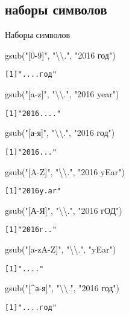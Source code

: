 \subsection{наборы символов}
\begin{frame}[fragile]{Наборы символов}
\begin{multicols}{2}
\begin{itemize} 
\mytem gsub("[0-9]"{}, "\textbackslash\textbackslash.{}"{}, "2016 год")
\footnotesize
\begin{alltt}
[1] ".... год"
\end{alltt}
\normalsize
\vfill
\mytem gsub("[a-z]"{}, "\textbackslash\textbackslash.{}"{}, "2016 year")
\footnotesize
\begin{alltt}
[1] "2016 ....{}"
\end{alltt}
\normalsize
\vfill
\mytem gsub("[а-я]"{}, "\textbackslash\textbackslash.{}"{}, "2016 год")
\footnotesize
\begin{alltt}
[1] "2016 ...{}"
\end{alltt}
\normalsize
\columnbreak
\mytem gsub("[A-Z]"{}, "\textbackslash\textbackslash.{}"{}, "2016 yEar")
\footnotesize
\begin{alltt}
[1] "2016 y.ar"
\end{alltt}
\normalsize
\vfill
\mytem gsub("[А-Я]"{}, "\textbackslash\textbackslash.{}"{}, "2016 гОД")
\footnotesize
\begin{alltt}
[1] "2016 г..{}"
\end{alltt}
\normalsize
\vfill
\mytem gsub("[a-zA-Z]"{}, "\textbackslash\textbackslash.{}"{}, "yEar")
\footnotesize
\begin{alltt}
[1] "...{}."
\end{alltt}
\normalsize
\vfill
\mytem gsub("[\^{}а-я]"{}, "\textbackslash\textbackslash.{}"{}, "2016 год")
\footnotesize
\begin{alltt}
[1] "....год"
\end{alltt}
\normalsize
\end{itemize}
\end{multicols}
\end{frame}
